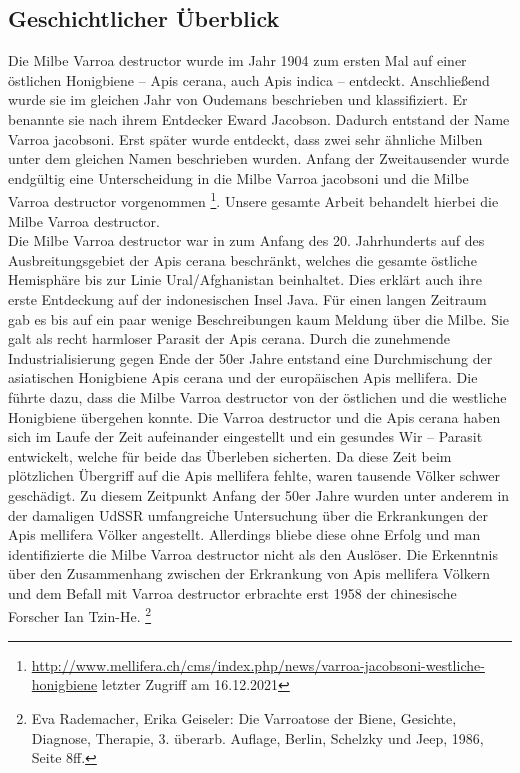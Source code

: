\documentclass[11pt,a4paper]{article}
\begin{document}
\subsection{Geschichtlicher Überblick}
Die Milbe Varroa destructor wurde im Jahr 1904 zum ersten Mal auf einer östlichen Honigbiene – Apis cerana, auch Apis indica – entdeckt. Anschließend wurde sie im gleichen Jahr von Oudemans beschrieben und klassifiziert. Er benannte sie nach ihrem Entdecker Eward Jacobson. Dadurch entstand der Name Varroa jacobsoni. Erst später wurde entdeckt, dass zwei sehr ähnliche Milben unter dem gleichen Namen beschrieben wurden. Anfang der Zweitausender wurde endgültig eine Unterscheidung in die Milbe Varroa jacobsoni und die Milbe Varroa destructor vorgenommen \footnote{\url{http://www.mellifera.ch/cms/index.php/news/varroa-jacobsoni-westliche-honigbiene} letzter Zugriff am 16.12.2021}. Unsere gesamte Arbeit behandelt hierbei die Milbe Varroa destructor. \\
Die Milbe Varroa destructor war in zum Anfang des 20. Jahrhunderts auf des Ausbreitungsgebiet der Apis cerana beschränkt, welches die gesamte östliche Hemisphäre bis zur Linie Ural/Afghanistan beinhaltet. Dies erklärt auch ihre erste Entdeckung auf der indonesischen Insel Java. Für einen langen Zeitraum gab es bis auf ein paar wenige Beschreibungen kaum Meldung über die Milbe. Sie galt als recht harmloser Parasit der Apis cerana. 
Durch die zunehmende Industrialisierung gegen Ende der 50er Jahre entstand eine Durchmischung der asiatischen Honigbiene Apis cerana und der europäischen Apis mellifera. Die führte dazu, dass die Milbe Varroa destructor von der östlichen und die westliche Honigbiene übergehen konnte. Die Varroa destructor und die Apis cerana haben sich im Laufe der Zeit aufeinander eingestellt und ein gesundes Wir – Parasit entwickelt, welche für beide das Überleben sicherten. Da diese Zeit beim plötzlichen Übergriff auf die Apis mellifera fehlte, waren tausende Völker schwer geschädigt. Zu diesem Zeitpunkt Anfang der 50er Jahre wurden unter anderem in der damaligen UdSSR umfangreiche Untersuchung über die Erkrankungen der Apis mellifera Völker angestellt. Allerdings bliebe diese ohne Erfolg und man identifizierte die Milbe Varroa destructor nicht als den Auslöser. Die Erkenntnis über den Zusammenhang zwischen der Erkrankung von Apis mellifera Völkern und dem Befall mit Varroa destructor erbrachte erst 1958 der chinesische Forscher Ian Tzin-He. \footnote{Eva Rademacher, Erika Geiseler: Die Varroatose der Biene, Gesichte, Diagnose, Therapie, 3. überarb. Auflage, Berlin, Schelzky und Jeep, 1986, Seite 8ff.}
\end{document}
